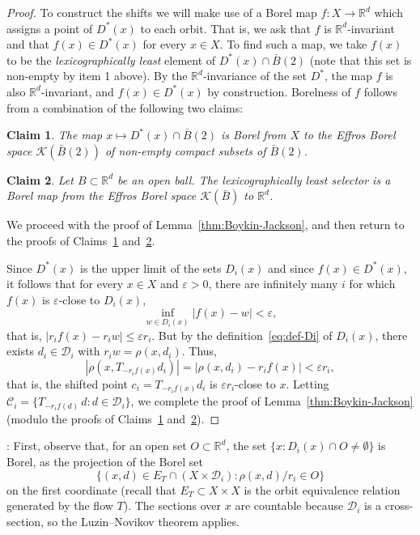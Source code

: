 \documentclass[11pt]{paper}
\newtheorem{claim}{Claim}
\newcommand{\bR}{\mathbb R}
\newcommand{\cD}{\mathcal D}
\newcommand{\cC}{\mathcal C}
\newcommand{\cK}{\mathcal K}
\newcommand{\eps}{\varepsilon}
\begin{document}
\begin{proof}
\smallskip
To construct the shifts we will make use of a Borel map $f\colon X\to\bR^d$ which assigns a
point of $D^*(x)$ to each orbit. That is, we ask that $f$ is $\bR^d$-invariant
and that $f(x)\in D^*(x)$ for every $x\in X$. To find such a map, we take $f(x)$ to be
the \emph{lexicographically least} element of $D^*(x)\cap \bar B(2)$ (note that this set is non-empty
by item 1 above). By the $\bR^d$-invariance of the set $D^*$, the map $f$ is also $\bR^d$-invariant, and $f(x)\in D^*(x)$ by construction. Borelness of $f$ follows from a combination of the following two claims:
\begin{claim}\label{claim:BorelnessEffros}
The map $x\mapsto D^*(x)\cap \bar B(2)$ is Borel from $X$ to the Effros Borel space
$\cK(\bar B(2))$ of non-empty compact subsets of $\bar B(2)$.
\end{claim}
\begin{claim}\label{claim:lex_least}
Let $B\subset \bR^d$ be an open ball.
The lexicographically least selector is a Borel map from the Effros Borel space
$\cK(\bar B)$ to $\bR^d$.
\end{claim}


\noindent
We proceed with the proof of Lemma~\ref{thm:Boykin-Jackson}, and then return
to the proofs of Claims~\ref{claim:BorelnessEffros} and~\ref{claim:lex_least}.




\medskip

Since $D^*(x)$ is the upper limit of the sets $D_i(x)$ and since
$f(x)\in D^*(x)$, it follows that for every $x\in X$ and $\eps>0$, there are infinitely many
$i$ for which $f(x)$ is $\eps$-close to $D_i(x)$,
\begin{equation}
\label{eq:dist-f-Di}
\inf_{w\in D_i(x)}|f(x)-w|< \eps,
\end{equation}
that is,  $|r_i f(x)-r_i w|\le \eps r_i$. But by the definition~\eqref{eq:def-Di} of $D_i(x)$,
there exists $d_i\in \cD_i$  with $r_i w=\rho(x, d_i)$. Thus,
\[
|\rho (x, T_{- r_i f(x)} d_i)| = |\rho (x, d_i) - r_i f(x)|<\eps r_i,
\]
that is, the shifted point $c_i = T_{-r_i f(x)} d_i$ is $\eps r_i$-close to $x$.
Letting $ \cC_i = \{ T_{-r_i f(d)}\,d\colon d\in\cD_i\}$,
we complete the proof of Lemma~\ref{thm:Boykin-Jackson} (modulo
the proofs of Claims~\ref{claim:BorelnessEffros} and~\ref{claim:lex_least}).
\end{proof}

:
First, observe that, for an open set $O\subset \bR^d$, the set
$\{x\colon D_i(x) \cap O \ne \emptyset \}$ is Borel, as the projection
of the Borel set
\[
\{ (x, d)\in E_T \cap (X\times \cD_i)\colon \rho (x, d)/r_i \in O \}
\]
on the first coordinate (recall that $E_T\subset X\times X$ is the orbit equivalence relation generated
by the flow $T$). The sections over $x$ are countable because $\cD_i$ is a cross-section, so
the Luzin--Novikov theorem applies.
\end{document}
